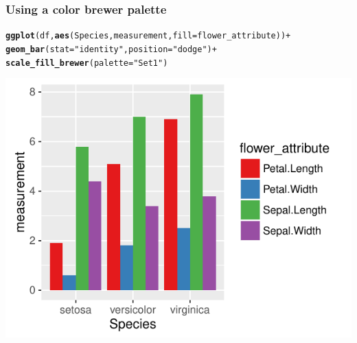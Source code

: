 \documentclass{beamer}\usepackage[]{graphicx}\usepackage[]{color}
\makeatletter
\newcommand{\hlstr}[1]{\textcolor[rgb]{0.192,0.494,0.8}{#1}}%
\newcommand{\hlopt}[1]{\textcolor[rgb]{0,0,0}{#1}}%
\newcommand{\hlstd}[1]{\textcolor[rgb]{0.345,0.345,0.345}{#1}}%
\newcommand{\hlkwc}[1]{\textcolor[rgb]{0.333,0.667,0.333}{#1}}%
\newcommand{\hlkwd}[1]{\textcolor[rgb]{0.737,0.353,0.396}{\textbf{#1}}}%
\newenvironment{kframe}{%
 \def\at@end@of@kframe{}%
 \ifinner\ifhmode%
  \def\at@end@of@kframe{\end{minipage}}%
  \begin{minipage}{\columnwidth}%
 \fi\fi%
 \def\FrameCommand##1{\hskip\@totalleftmargin \hskip-\fboxsep
 \colorbox{shadecolor}{##1}\hskip-\fboxsep
     \hskip-\linewidth \hskip-\@totalleftmargin \hskip\columnwidth}%
 \MakeFramed {\advance\hsize-\width
   \@totalleftmargin\z@ \linewidth\hsize
   \@setminipage}}%
 {\par\unskip\endMakeFramed%
 \at@end@of@kframe}
\newenvironment{knitrout}{}{} %
\makeatother
\begin{document}

\begin{frame}[fragile]
\frametitle{Using a color brewer palette}
\begin{knitrout}\footnotesize
{}\color{fgcolor}\begin{kframe}
\begin{alltt}
\hlkwd{ggplot}\hlstd{(df,} \hlkwd{aes}\hlstd{(Species, measurement,} \hlkwc{fill} \hlstd{= flower_attribute))} \hlopt{+}
    \hlkwd{geom_bar}\hlstd{(}\hlkwc{stat} \hlstd{=} \hlstr{"identity"}\hlstd{,} \hlkwc{position} \hlstd{=} \hlstr{"dodge"}\hlstd{)} \hlopt{+}
    \hlkwd{scale_fill_brewer}\hlstd{(}\hlkwc{palette} \hlstd{=} \hlstr{"Set1"}\hlstd{)}
\end{alltt}
\end{kframe}

{\centering \includegraphics[width=.75\linewidth]{figure/barcolors-1} 

}



\end{knitrout}
\end{frame}

\end{document}
